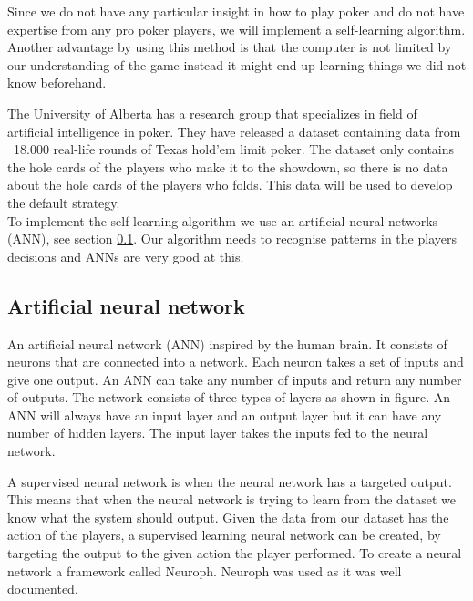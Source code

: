 Since we do not have any particular insight in how to play poker and do not have expertise from any pro poker players, we will implement a self-learning algorithm. Another advantage by using this method is that the computer is not limited by our understanding of the game instead it might end up learning things we did not know beforehand.

The University of Alberta has a research group that specializes in field of artificial intelligence in poker. They have released a dataset containing data from ~18.000 real-life rounds of Texas hold'em limit poker. The dataset only contains the hole cards of the players who make it to the showdown, so there is no data about the hole cards of the players who folds. This data will be used to develop the default strategy.\\

To implement the self-learning algorithm we use an artificial neural networks (ANN), see section \ref{sec:nn}. Our algorithm needs to recognise patterns in the players decisions and ANNs are very good at this. 

\subsection{Artificial neural network}
\label{sec:nn}
An artificial neural network (ANN) inspired by the human brain. It consists of neurons that are connected into a network. Each neuron takes a set of inputs and give one output. An ANN can take any number of inputs and return any number of outputs. The network consists of three types of layers as shown in figure. An ANN will always have an input layer and an output layer but it can have any number of hidden layers. The input layer takes the inputs fed to the neural network. 

A supervised neural network is when the neural network has a targeted output. This means that when the neural network is trying to learn from the dataset we know what the system should output. Given the data from our dataset has the action of the players, a supervised learning neural network can be created, by targeting the output to the given action the player performed. To create a neural network a framework called Neuroph. Neuroph was used as it was well documented.\\

